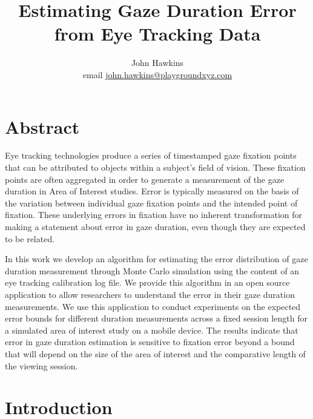 \documentclass[12pt,a4paper]{article}
\numberwithin{equation}{section}
\begin{document}
 
\title{Estimating Gaze Duration Error from Eye Tracking Data}

\author{
John Hawkins \\ email \href{mailto:john.hawkins@playgroundxyz.com}{john.hawkins@playgroundxyz.com} \\
} 

\maketitle

\section{Abstract}

Eye tracking technologies produce a series of timestamped gaze fixation points 
that can be attributed to objects within a subject's field of vision. 
These fixation points are often aggregated in order to generate a measurement
of the gaze duration in Area of Interest studies.
Error is typically measured on the basis of the variation between individual 
gaze fixation points and the intended point of fixation.
These underlying errors in fixation have no inherent transformation for making
a statement about error in gaze duration, even though they are expected to be
related.

In this work we develop an algorithm for estimating the error distribution of 
gaze duration measurement through Monte Carlo simulation using the content 
of an eye tracking calibration log file. 
We provide this algorithm in an open source application
to allow researchers to understand the error in their gaze duration measurements. 
We use this application to conduct experiments on the expected error bounds for 
different duration measurements across a fixed session length for a simulated 
area of interest study on a mobile device. 
The results indicate that error in gaze duration estimation is sensitive to
fixation error beyond a bound that will depend on the size of the area of interest 
and the comparative length of the viewing session.

\section{Introduction}
\end{document}
